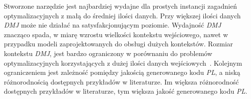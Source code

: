 Stworzone narzędzie jest najbardziej wydajne dla prostych instancji zagadnień optymalizacyjnych z małą do średniej ilości danych. %
 Przy większej ilości danych \textit{DMJ} może nie działać na satysfakcjonującym poziomie. %
 Wydajność \textit{DMJ} znacząco spada, w miarę wzrostu wielkości kontekstu wejściowego, nawet w przypadku modeli zaprojektowanych do obsługi dużych kontekstów. Rozmiar kontekstu \textit{DMJ}, jest bardzo ograniczony w porównaniu do problemów optymalizacyjnych korzystających z dużej ilości danych wejściowych~\cite{10.1162/tacl_a_00638}. Kolejnym ograniczeniem jest zależność pomiędzy jakością generowanego kodu \textit{PL}, a niską różnorodnością dostępnych przykładów w literaturze. Im większa różnorodność dostępnych przykładów w literaturze, tym większa jakość generowanego kodu \textit{PL}.
 

